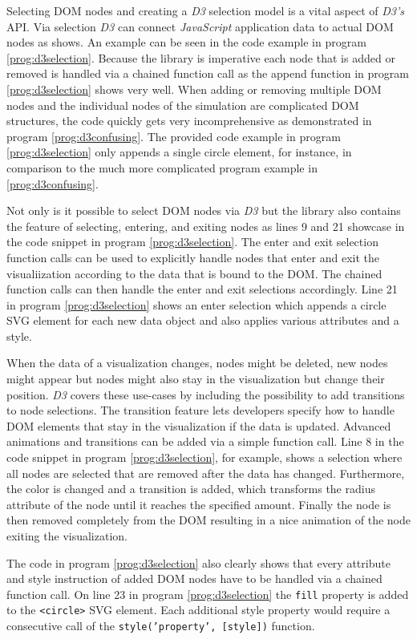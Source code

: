 Selecting DOM nodes and creating a \emph{D3} selection model is a vital aspect of \emph{D3's} API. Via selection \emph{D3} can connect \emph{JavaScript} application data to actual DOM nodes as \cite{D3Github} shows. An example can be seen in the code example in program \ref{prog:d3selection}. Because the library is imperative each node that is added or removed is handled via a chained function call as the append function in program \ref{prog:d3selection} shows very well. When adding or removing multiple DOM nodes and the individual nodes of the simulation are complicated DOM structures, the code quickly gets very incomprehensive as demonstrated in program \ref{prog:d3confusing}. The provided code example in program \ref{prog:d3selection} only appends a single circle element, for instance, in comparison to the much more complicated program example in \ref{prog:d3confusing}. 

Not only is it possible to select DOM nodes via \emph{D3} but the library also contains the feature of selecting, entering, and exiting nodes as lines 9 and 21 showcase in the code snippet in program \ref{prog:d3selection}. The enter and exit selection function calls can be used to explicitly handle nodes that enter and exit the visualiization according to the data that is bound to the DOM. The chained function calls can then handle the enter and exit selections accordingly. Line 21 in program \ref{prog:d3selection} shows an enter selection which appends a circle SVG element for each new data object and also applies various attributes and a style.

When the data of a visualization changes, nodes might be deleted, new nodes might appear but nodes might also stay in the visualization but change their position. \emph{D3} covers these use-cases by including the possibility to add transitions to node selections. The transition feature lets developers specify how to handle DOM elements that stay in the visualization if the data is updated. Advanced animations and transitions can be added via a simple function call. Line 8 in the code snippet in program \ref{prog:d3selection}, for example, shows a selection where all nodes are selected that are removed after the data has changed. Furthermore, the color is changed and a transition is added, which transforms the radius attribute of the node until it reaches the specified amount. Finally the node is then removed completely from the DOM resulting in a nice animation of the node exiting the visualization.

The code in program \ref{prog:d3selection} also clearly shows that every attribute and style instruction of added DOM nodes have to be handled via a chained function call. On line 23 in program \ref{prog:d3selection} the \texttt{fill} property is added to the \texttt{<circle>} SVG element. Each additional style property would require a consecutive call of the \texttt{style('property', [style])} function.

